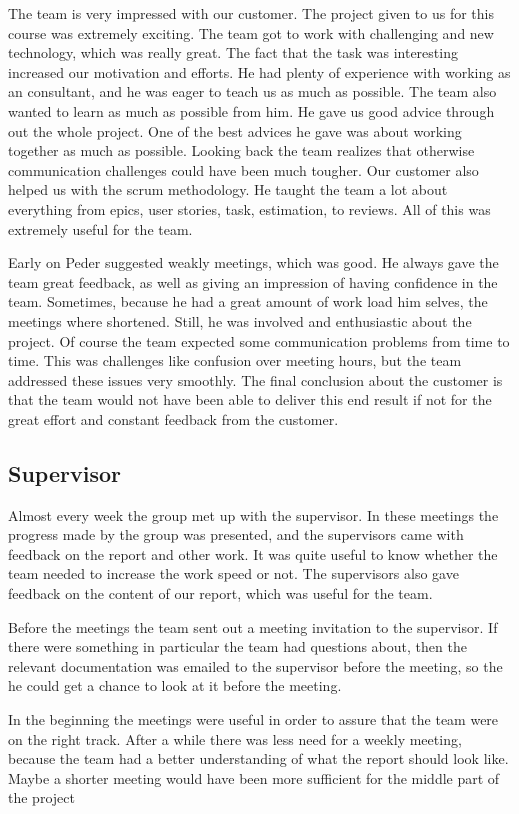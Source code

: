 The team is very impressed with our customer. The project given to us for this course was extremely exciting. The team got to work with challenging and new technology, which was really great. The fact that the task was interesting increased our motivation and efforts. He had plenty of experience with working as an consultant, and he was eager to teach us as much as possible. The team also wanted to learn as much as possible from him. He gave us good advice through out the whole project. One of the best advices he gave was about working together as much as possible. Looking back the team realizes that otherwise communication challenges could have been much tougher. Our customer also helped us with the scrum methodology. He taught the team a lot about everything from epics, user stories, task, estimation, to reviews. All of this was extremely useful for the team.

Early on Peder suggested weakly meetings, which was good. He always gave the team great feedback, as well as giving an impression of having confidence in the team. Sometimes, because he had a great amount of work load him selves, the meetings where shortened. Still, he was involved and enthusiastic about the project. Of course the team expected some communication problems from time to time. This was challenges like confusion over meeting hours, but the team addressed these issues very smoothly. The final conclusion about the customer is that the team would not have been able to deliver this end result if not for the great effort and constant feedback from the customer. 

\subsection{Supervisor}
Almost every week the group met up with the supervisor. In these meetings the progress made by the group was presented, and the supervisors came with feedback on the report and other work. It was quite useful to know whether the team needed to increase the work speed or not. 
The supervisors also gave feedback on the content of our report, which was useful for the team.

Before the meetings the team sent out a meeting invitation to the supervisor.
If there were something in particular the team had questions about, then the relevant documentation was emailed to the supervisor before the meeting, so the he could get a chance to look at it before the meeting.

In the beginning the meetings were useful in order to assure that the team were on the right track. After a while there was less need for a weekly meeting, because the team had a better understanding of what the report should look like.
Maybe a shorter meeting would have been more sufficient for the middle part of the project 

